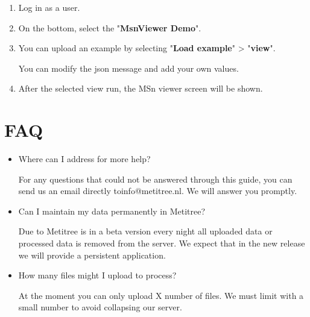 \documentclass[12pt]{report}
\begin{document}
\begin{enumerate}
\item Log in as a user.
\item On the bottom, select the "\textbf{MsnViewer Demo}".
\item You can upload an example by selecting "\textbf{Load example}" >
"\textbf{view}".

You can modify the json message and add your own values. 

\begin{center}
\begin{figure}[H]
\end{figure}
\end{center}

\item After the selected view run, the MSn viewer screen will be shown.

\end{enumerate}

\newpage
\section{FAQ} 

\begin{itemize}
\item Where can I address for more help? 

For any questions that could not be answered through this guide, you can send us an email directly toinfo@metitree.nl. We will answer you promptly. 

\item Can I maintain my data permanently in Metitree? 

Due to Metitree is in a beta version every night all uploaded data or processed data is removed from the server. We expect that in the new release we will provide a persistent application. 

\item How many files might I upload to process?

At the moment you can only upload X number of files. We must limit with a small number to avoid collapsing our server.

\end{itemize}
\end{document}
